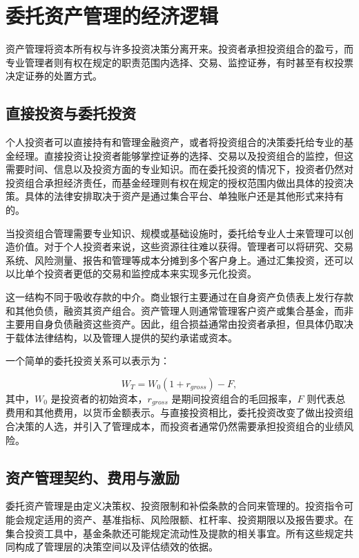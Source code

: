 \section{委托资产管理的经济逻辑}

资产管理将资本所有权与许多投资决策分离开来。投资者承担投资组合的盈亏，而专业管理者则有权在规定的职责范围内选择、交易、监控证券，有时甚至有权投票决定证券的处置方式。

\subsection{直接投资与委托投资}

个人投资者可以直接持有和管理金融资产，或者将投资组合的决策委托给专业的基金经理。直接投资让投资者能够掌控证券的选择、交易以及投资组合的监控，但这需要时间、信息以及投资方面的专业知识。而在委托投资的情况下，投资者仍然对投资组合承担经济责任，而基金经理则有权在规定的授权范围内做出具体的投资决策。具体的法律安排取决于资产是通过集合平台、单独账户还是其他形式来持有的。

当投资组合管理需要专业知识、规模或基础设施时，委托给专业人士来管理可以创造价值。对于个人投资者来说，这些资源往往难以获得。管理者可以将研究、交易系统、风险测量、报告和管理等成本分摊到多个客户身上。通过汇集投资，还可以以比单个投资者更低的交易和监控成本来实现多元化投资。

这一结构不同于吸收存款的中介。商业银行主要通过在自身资产负债表上发行存款和其他负债，融资其资产组合。资产管理人则通常管理客户资产或集合基金，而非主要用自身负债融资这些资产。因此，组合损益通常由投资者承担，但具体仍取决于载体法律结构，以及管理人提供的契约承诺或资本。

一个简单的委托投资关系可以表示为：

\begin{equation}
W_T=W_0(1+r_{gross})-F,
\label{eq:ch14-investor-terminal-wealth}
\end{equation}
其中，$W_0$ 是投资者的初始资本，$r_{gross}$ 是期间投资组合的毛回报率，$F$ 则代表总费用和其他费用，以货币金额表示。与直接投资相比，委托投资改变了做出投资组合决策的人选，并引入了管理成本，而投资者通常仍然需要承担投资组合的业绩风险。

\subsection{资产管理契约、费用与激励}

委托资产管理是由定义决策权、投资限制和补偿条款的合同来管理的。投资指令可能会规定适用的资产、基准指标、风险限额、杠杆率、投资期限以及报告要求。在集合投资工具中，基金条款还可能规定流动性及提款的相关事宜。所有这些规定共同构成了管理层的决策空间以及评估绩效的依据。

